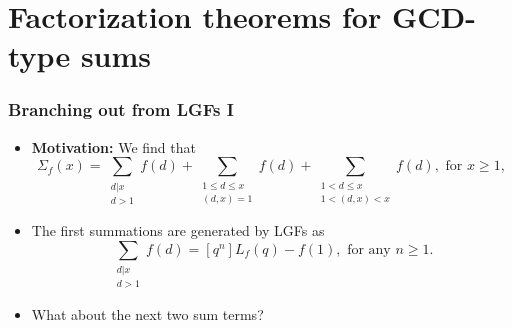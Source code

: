 \section{Factorization theorems for GCD-type sums}

\begin{frame}
\frametitle{Branching out from LGFs I}
\begin{itemize} 

\pause\item \textbf{Motivation:} We find that 
      \[
      \Sigma_f(x) = \sum_{\substack{d|x \\ d>1}} f(d) + 
	       \sum_{\substack{1 \leq d \leq x \\ (d,x)=1}} f(d) +  
	       \sum_{\substack{1 < d \leq x \\ 1 < (d,x) < x}} f(d), \text{ for } x \geq 1, 
      \]
\pause\item The first summations are generated by LGFs as 
      \[
      \sum_{\substack{d|x \\ d>1}} f(d) = [q^n]L_f(q) - f(1), 
           \text{ for any } n \geq 1. 
      \]
\pause\item What about the next two sum terms? 

\end{itemize}

\end{frame}

